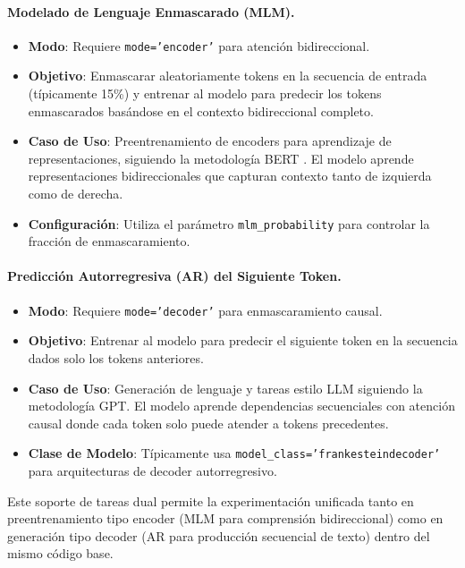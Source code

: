 \documentclass[11pt,a4paper]{article}
\begin{document}
\paragraph{Modelado de Lenguaje Enmascarado (MLM).}
\begin{itemize}[leftmargin=*]
    \item \textbf{Modo}: Requiere \texttt{mode='encoder'} para atención bidireccional.
    \item \textbf{Objetivo}: Enmascarar aleatoriamente tokens en la secuencia de entrada (típicamente 15\%) y entrenar al modelo para predecir los tokens enmascarados basándose en el contexto bidireccional completo.
    \item \textbf{Caso de Uso}: Preentrenamiento de encoders para aprendizaje de representaciones, siguiendo la metodología BERT \citep{devlin_bert_2019}. El modelo aprende representaciones bidireccionales que capturan contexto tanto de izquierda como de derecha.
    \item \textbf{Configuración}: Utiliza el parámetro \texttt{mlm\_probability} para controlar la fracción de enmascaramiento.
\end{itemize}

\paragraph{Predicción Autorregresiva (AR) del Siguiente Token.}
\begin{itemize}[leftmargin=*]
    \item \textbf{Modo}: Requiere \texttt{mode='decoder'} para enmascaramiento causal.
    \item \textbf{Objetivo}: Entrenar al modelo para predecir el siguiente token en la secuencia dados solo los tokens anteriores.
    \item \textbf{Caso de Uso}: Generación de lenguaje y tareas estilo LLM siguiendo la metodología GPT. El modelo aprende dependencias secuenciales con atención causal donde cada token solo puede atender a tokens precedentes.
    \item \textbf{Clase de Modelo}: Típicamente usa \texttt{model\_class='frankesteindecoder'} para arquitecturas de decoder autorregresivo.
\end{itemize}

Este soporte de tareas dual permite la experimentación unificada tanto en preentrenamiento tipo encoder (MLM para comprensión bidireccional) como en generación tipo decoder (AR para producción secuencial de texto) dentro del mismo código base.
\end{document}
